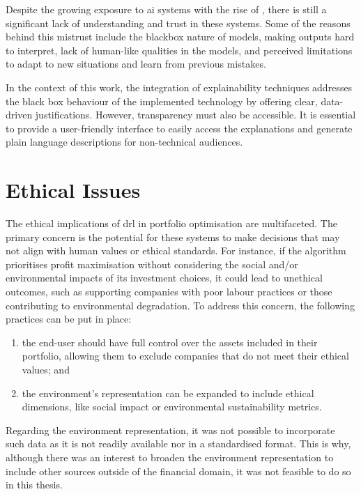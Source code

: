 Despite the growing exposure to \acrfull{ai} systems with the rise of , there is still a significant lack of understanding and trust in these systems. Some of the reasons behind this mistrust include the \gls{blackbox} nature of models, making outputs hard to interpret, lack of human-like qualities in the models, and perceived limitations to adapt to new situations and learn from previous mistakes.

In the context of this work, the integration of explainability techniques addresses the black box behaviour of the implemented technology by offering clear, data-driven justifications. However, transparency must also be accessible. It is essential to provide a user-friendly interface to easily access the explanations and generate plain language descriptions for non-technical audiences.

\section{Ethical Issues} \label{sec:ethical-issues}

The ethical implications of \acrshort{drl} in portfolio optimisation are multifaceted. The primary concern is the potential for these systems to make decisions that may not align with human values or ethical standards. For instance, if the algorithm prioritises profit maximisation without considering the social and/or environmental impacts of its investment choices, it could lead to unethical outcomes, such as supporting companies with poor labour practices or those contributing to environmental degradation. To address this concern, the following practices can be put in place:
\begin{enumerate}
    \item the end-user should have full control over the assets included in their portfolio, allowing them to exclude companies that do not meet their ethical values; and
    \item the environment's representation can be expanded to include ethical dimensions, like social impact or environmental sustainability metrics.
\end{enumerate}

Regarding the environment representation, it was not possible to incorporate such data as it is not readily available nor in a standardised format. This is why, although there was an interest to broaden the environment representation to include other sources outside of the financial domain, it was not feasible to do so in this thesis.

